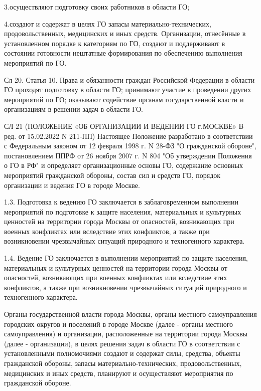 \documentclass[a4paper, 12pt]{article}
\theoremstyle{definition}
\begin{document}
        3.осуществляют подготовку своих работников в области ГО;
        
        4.создают и содержат в целях ГО запасы материально-технических, продовольственных, медицинских и иных средств.
        Организации, отнесённые в установленном порядке к категориям по ГО, создают и поддерживают в состоянии готовности нештатные формирования по обеспечению выполнения мероприятий по ГО.
        
        Сл 20. Статья 10. Права и обязанности граждан Российской Федерации в области ГО
        проходят подготовку в области ГО;
        принимают участие в проведении других мероприятий по ГО;
        оказывают содействие органам государственной власти и организациям в решении задач в области ГО.
        
        СЛ 21 (ПОЛОЖЕНИЕ «ОБ ОРГАНИЗАЦИИ И ВЕДЕНИИ ГО г.МОСКВЕ» В ред. от 15.02.2022 N 211-ПП)
        Настоящее Положение разработано в соответствии с Федеральным законом от 12 февраля 1998 г. N 28-ФЗ "О гражданской обороне", постановлением ППРФ от 26 ноября 2007 г. N 804 "Об утверждении Положения о ГО в РФ" и определяет организационные основы ГО, содержание основных мероприятий гражданской обороны, состав сил и средств ГО, порядок организации и ведения ГО в городе Москве.
        
        1.3. Подготовка к ведению ГО заключается в заблаговременном выполнении мероприятий по подготовке к защите населения, материальных и культурных ценностей на территории города Москвы от опасностей, возникающих при военных конфликтах или вследствие этих конфликтов, а также при возникновении чрезвычайных ситуаций природного и техногенного характера.
        
        1.4. Ведение ГО заключается в выполнении мероприятий по защите населения, материальных и культурных ценностей на территории города Москвы от опасностей, возникающих при военных конфликтах или вследствие этих конфликтов, а также при возникновении чрезвычайных ситуаций природного 
        и техногенного характера.
        
        Органы государственной власти города Москвы, органы местного самоуправления городских округов и поселений в городе Москве (далее - органы местного самоуправления) и организации, расположенные на территории города Москвы (далее - организации), в целях решения задач в области ГО в соответствии с установленными полномочиями создают и содержат силы, средства, объекты гражданской обороны, запасы материально-технических, продовольственных, медицинских и иных средств, планируют и осуществляют мероприятия по гражданской обороне.
\end{document}

